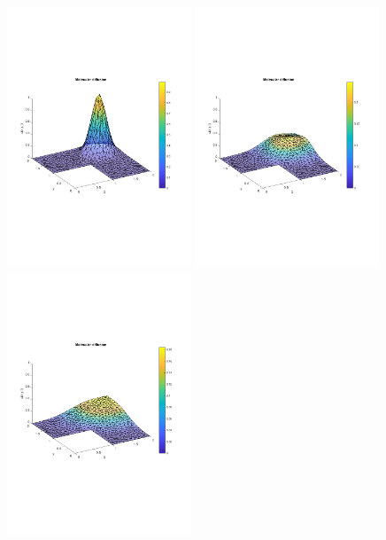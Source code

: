 \documentclass[11pt, a4paper]{article}
\begin{document}
\begin{figure}
  \includegraphics[width=0.49\textwidth]{assets/sol_t0_3030.pdf}
  \includegraphics[width=0.49\textwidth]{assets/sol_t1_3030.pdf}
  \includegraphics[width=0.49\textwidth]{assets/sol_t2_3030.pdf}

\end{figure}
\end{document}
